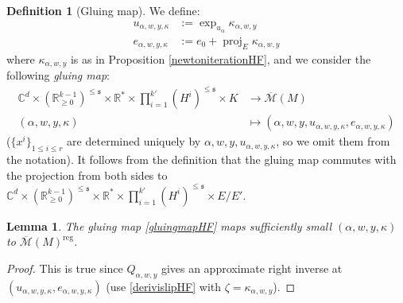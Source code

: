 \documentclass[12pt]{article}
\newtheorem{lemma}[theorem]{Lemma}
\theoremstyle{definition}
\newtheorem{definition}[theorem]{Definition}
\theoremstyle{remark}
\numberwithin{equation}{subsection}
\newcommand{\s}{\mathfrak s}
\newcommand{\CC}{\mathbb C}
\newcommand{\RR}{\mathbb R}
\newcommand{\proj}{\operatorname{proj}}
\newcommand{\Mbar}{\overline{\mathcal M}}
\newcommand{\reg}{\mathrm{reg}}
\begin{document}
\begin{definition}[Gluing map]
We define:
\begin{align}
u_{\alpha,w,y,\kappa}&:=\exp_{u_\alpha}\kappa_{\alpha,w,y}\\
e_{\alpha,w,y,\kappa}&:=e_0+\proj_E\kappa_{\alpha,w,y}
\end{align}
where $\kappa_{\alpha,w,y}$ is as in Proposition \ref{newtoniterationHF}, and we consider the following \emph{gluing map}:
\begin{align}\label{gluingmapHF}
\CC^d\times(\RR_{\geq 0}^{k-1})^{\leq\s}\times\RR^\ast\times\prod_{i=1}^{k\prime}(H^i)^{\leq\s}\times K&\to\Mbar(M)\\
(\alpha,w,y,\kappa)&\mapsto(\alpha,w,y,u_{\alpha,w,y,\kappa},e_{\alpha,w,y,\kappa})
\end{align}
($\{x^i\}_{1\leq i\leq r}$ are determined uniquely by $\alpha,w,y,u_{\alpha,w,y,\kappa}$, so we omit them from the notation).  It follows from the definition that the gluing map commutes with the projection from both sides to $\CC^d\times(\RR_{\geq 0}^{k-1})^{\leq\s}\times\RR^\ast\times\prod_{i=1}^{k\prime}(H^i)^{\leq\s}\times E/E'$.
\end{definition}

\begin{lemma}\label{mapsstufftoregHF}
The gluing map \eqref{gluingmapHF} maps sufficiently small $(\alpha,w,y,\kappa)$ to $\Mbar(M)^\reg$.
\end{lemma}

\begin{proof}
This is true since $Q_{\alpha,w,y}$ gives an approximate right inverse at $(u_{\alpha,w,y,\kappa},e_{\alpha,w,y,\kappa})$ (use \eqref{derivislipHF} with $\zeta=\kappa_{\alpha,w,y}$).
\end{proof}
\end{document}
